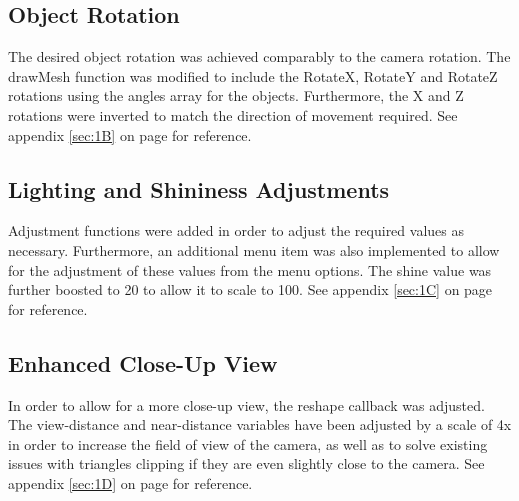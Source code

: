 \documentclass{article}
\begin{document}
\subsection{Object Rotation}
The desired object rotation was achieved comparably to the camera rotation. The drawMesh function was modified to include the RotateX, RotateY and RotateZ rotations using the angles array for the objects. Furthermore, the X and Z rotations were inverted to match the direction of movement required.
\newline
\newline
See appendix \ref{sec:1B} on page \pageref{sec:1B} for reference.


\subsection{Lighting and Shininess Adjustments}

Adjustment functions were added in order to adjust the required values as necessary. Furthermore, an additional menu item was also implemented to allow for the adjustment of these values from the menu options. The shine value was further boosted to 20 to allow it to scale to 100.
\newline
\newline
See appendix \ref{sec:1C} on page \pageref{sec:1C} for reference.




\subsection{Enhanced Close-Up View}

In order to allow for a more close-up view, the reshape callback was adjusted. The view-distance and near-distance variables have been adjusted by a scale of 4x in order to increase the field of view of the camera, as well as to solve existing issues with triangles clipping if they are even slightly close to the camera.
\newline
\newline
See appendix \ref{sec:1D} on page \pageref{sec:1D} for reference.
\end{document}
